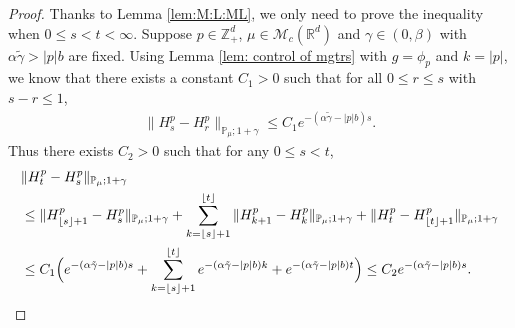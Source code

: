 \documentclass[12pt,a4paper]{amsart}
\theoremstyle{plain}
\theoremstyle{definition}
\numberwithin{equation}{section}
\begin{document}
\begin{proof}
  Thanks to Lemma \ref{lem:M:L:ML}, we only  need to prove the inequality  when $0\leq s < t<\infty$.
  Suppose $p\in \mathbb{Z}_+^d$, $\mu\in \mathcal M_c(\mathbb R^d)$ and  $\gamma \in (0,\beta)$ with $\alpha \tilde \gamma > |p|b$ are fixed.
  Using Lemma \ref{lem: control of mgtrs} with $g=\phi_p$ and $k=|p|$,  we know that there exists a constant $C_1>0$ such that for all $0\leq r\leq s $ with $s-r\leq1$,
  \begin{align}
    \|H^p_s-H^p_r\|_{\mathbb P_\mu; 1+\gamma}
    \leq  C_1 e^{-(\alpha\tilde \gamma-|p|b)s}.
  \end{align}
  Thus there exists $C_2>0$ such that for any $0\leq s<t$,
  \begin{align}
    & \|H^p_t-H^p_s\|_{\mathbb{P}_{\mu};1+\gamma} \\
    & \leq \|H^p_{\lfloor s \rfloor+1}-H^p_s\|_{\mathbb{P}_{\mu};1+\gamma}+\sum_{k=\lfloor s \rfloor+1}^{\lfloor t \rfloor}\|H^p_{k+1}-H^p_{k}\|_{\mathbb{P}_{\mu};1+\gamma}+\|H^p_t-H^p_{\lfloor t \rfloor+1}\|_{\mathbb{P}_{\mu};1+\gamma} \\
    & \leq C_1 \Big(e^{-(\alpha \tilde \gamma- |p|b) s}+\sum_{k=\lfloor s \rfloor+1}^{\lfloor t \rfloor} e^{-(\alpha \tilde \gamma- |p|b) k} + e^{-(\alpha \tilde \gamma-|p|b) t}\Big)
      \leq C_2e^{-(\alpha \tilde \gamma-|p|b)s}.
      \qedhere
  \end{align}	
\end{proof}
\end{document}
